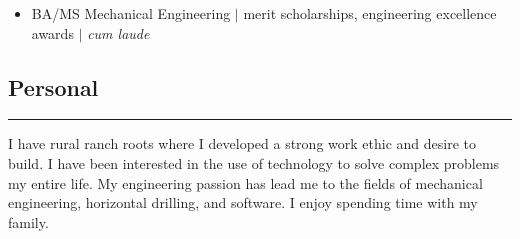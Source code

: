 \documentclass[12pt]{article}
\newenvironment{roles}
{ \vspace{0.25em}
  \begin{itemize}
    \setlength{\itemsep}{-0.75em}
    \setlength{\parskip}{0em}
    \setlength{\parsep}{-0.5em}
    \setlength{\partopsep}{0pt}
    \setlength{\topsep}{0pt}
}
{ \end{itemize}
  \vspace{0.5em}
}
\newcommand*\nvssec{
  \vspace{-1.5em}
  \subsection*
}
\newenvironment{majitem}
{
  \vspace{-0.5em}
  \item[]
}
{
  \vspace{0.5em}
}
\begin{document}
\begin{roles}
  
  \begin{majitem}
    BA/MS Mechanical Engineering $\vert$ merit scholarships, engineering excellence awards $\vert$ \emph{cum laude}
  \end{majitem}

 
\end{roles}


\nvssec{Personal}
\vspace{-1.5em}
\noindent\rule{\textwidth}{0.5pt}
\indent I have rural ranch roots where I developed a strong work ethic and desire to build.  I have been interested in the use of technology to solve complex problems my entire life.  My engineering passion has lead me to the fields of mechanical engineering, horizontal drilling, and software.  I enjoy spending time with my family.
\end{document}

